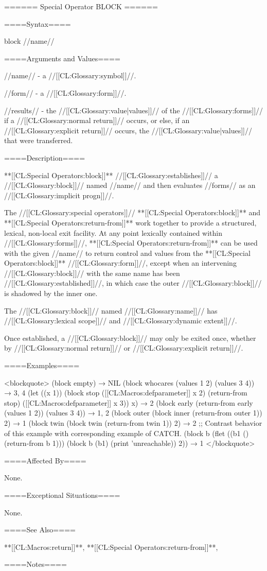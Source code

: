 ====== Special Operator BLOCK ======

====Syntax====

\DefspecWithValues block {//name// } {}

====Arguments and Values====

//name// - a //[[CL:Glossary:symbol]]//.

//form// - a //[[CL:Glossary:form]]//.

//results// - the //[[CL:Glossary:value|values]]// of the //[[CL:Glossary:forms]]// if a //[[CL:Glossary:normal return]]// occurs, or else, if an //[[CL:Glossary:explicit return]]// occurs, the //[[CL:Glossary:value|values]]// that were transferred.

====Description====

**[[CL:Special Operators:block]]** //[[CL:Glossary:establishes]]// a //[[CL:Glossary:block]]// named //name// and then evaluates //forms// as an //[[CL:Glossary:implicit progn]]//.

The //[[CL:Glossary:special operators]]// **[[CL:Special Operators:block]]** and **[[CL:Special Operators:return-from]]** work together to provide a structured, lexical, non-local exit facility. At any point lexically contained within //[[CL:Glossary:forms]]//, **[[CL:Special Operators:return-from]]** can be used with the given //name// to return control and values from the **[[CL:Special Operators:block]]** //[[CL:Glossary:form]]//, except when an intervening //[[CL:Glossary:block]]// with the same name has been //[[CL:Glossary:established]]//, in which case the outer //[[CL:Glossary:block]]// is shadowed by the inner one.

The //[[CL:Glossary:block]]// named //[[CL:Glossary:name]]// has //[[CL:Glossary:lexical scope]]// and //[[CL:Glossary:dynamic extent]]//.

Once established, a //[[CL:Glossary:block]]// may only be exited once, whether by //[[CL:Glossary:normal return]]// or //[[CL:Glossary:explicit return]]//.

====Examples====

<blockquote> (block empty) → NIL (block whocares (values 1 2) (values 3 4)) → 3, 4 (let ((x 1)) (block stop ([[CL:Macros:defparameter]] x 2) (return-from stop) ([[CL:Macros:defparameter]] x 3)) x) → 2 (block early (return-from early (values 1 2)) (values 3 4)) → 1, 2 (block outer (block inner (return-from outer 1)) 2) → 1 (block twin (block twin (return-from twin 1)) 2) → 2 ;; Contrast behavior of this example with corresponding example of CATCH. (block b (flet ((b1 () (return-from b 1))) (block b (b1) (print 'unreachable)) 2)) → 1 </blockquote>

====Affected By====

None.

====Exceptional Situations====

None.

====See Also====

**[[CL:Macros:return]]**, **[[CL:Special Operators:return-from]]**, {\secref\Evaluation}

====Notes====

